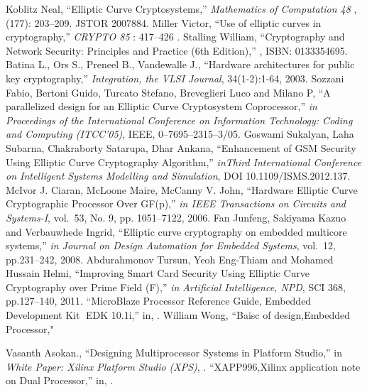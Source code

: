 \documentclass[preprint,12pt]{elsarticle}
\begin{document}
\begin{thebibliography}{00}
{Koblitz Neal}, ``{Elliptic Curve Cryptosystems},'' \emph{Mathematics of Computation 48 }, (177): 203--209. JSTOR 2007884.
{Miller Victor}, ``{Use of elliptic curves in cryptography},'' \emph{CRYPTO 85 }: 417--426 .
{Stalling William}, ``{Cryptography and Network Security: Principles and Practice (6th Edition)},'' , ISBN: 0133354695.
{Batina L., Ors S., Preneel B., Vandewalle J.}, ``{Hardware architectures for public key cryptography},'' \emph{Integration, the VLSI Journal}, 34(1-2):1-64, 2003.
{Sozzani Fabio, Bertoni Guido, Turcato Stefano, Breveglieri Luco and Milano P}, ``{A parallelized design for an Elliptic Curve Cryptosystem Coprocessor},'' \emph{in Proceedings of the International Conference on Information Technology: Coding and Computing (ITCC’05)}, IEEE, 0--7695--2315--3/05.
{Goswami Sukalyan, Laha Subarna, Chakraborty Satarupa, Dhar Ankana}, ``{Enhancement of GSM Security Using Elliptic Curve Cryptography Algorithm},'' \emph{inThird International Conference on Intelligent Systems Modelling and Simulation}, DOI 10.1109/ISMS.2012.137.
{McIvor J. Ciaran, McLoone Maire, McCanny V. John}, ``{Hardware Elliptic Curve Cryptographic Processor Over GF(p)},'' \emph{in IEEE Transactions on Circuits and Systems-I}, vol.~53, No. 9,  pp. 1051--7122, 2006.
{Fan Junfeng, Sakiyama Kazuo and Verbauwhede Ingrid}, ``{Elliptic curve cryptography on embedded multicore systems},'' \emph{in Journal
on Design Automation for Embedded Systems}, vol.~12, pp.231--242, 2008.
{Abdurahmonov Tursun, Yeoh Eng-Thiam and Mohamed Hussain Helmi}, ``{Improving Smart Card Security Using Elliptic
Curve Cryptography over Prime Field (F)},'' \emph{in Artificial Intelligence, NPD}, SCI 368, pp.127--140, 2011.
``{MicroBlaze Processor Reference Guide,
 Embedded Development Kit EDK 10.1i},'' in, .
{William Wong}, ``{Baisc of design,Embedded Processor},"

{Vasanth Asokan.}, ``{Designing Multiprocessor
Systems in Platform Studio},'' in \emph{White Paper: Xilinx Platform Studio (XPS)}, .
``{XAPP996,Xilinx application note on 
Dual Processor},'' in, .

\end{thebibliography}
\end{document}
